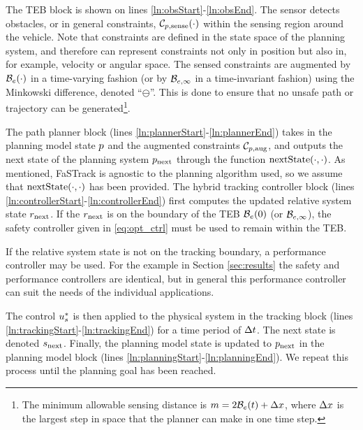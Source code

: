 The TEB block is shown on lines \ref{ln:obsStart}-\ref{ln:obsEnd}. 
The sensor detects obstacles, or in general constraints, $\mathcal C_{p,\text{sense}}(\cdot)$ within the sensing region around the vehicle.
Note that constraints are defined in the state space of the planning system, and therefore can represent constraints not only in position but also in, for example, velocity or angular space.
The sensed constraints are augmented by $\mathcal B_e(\cdot)$ in a time-varying fashion (or by $\mathcal B_{e, \infty}$ in a time-invariant fashion) using the Minkowski difference, denoted ``$\ominus$''. 
This is done to ensure that no unsafe path or trajectory can be generated\footnote{The minimum allowable sensing distance is $m = 2\mathcal B_e(t) + \Delta x$, where $\Delta x$ is the largest step in space that the planner can make in one time step.}.

The path planner block (lines \ref{ln:plannerStart}-\ref{ln:plannerEnd}) takes in the planning model state $p$ and the augmented constraints $\mathcal C_{p,\text{aug}}$, and outputs the next state of the planning system $p_\text{next}$ through the function $\text{nextState}(\cdot, \cdot)$.
As mentioned, FaSTrack is agnostic to the planning algorithm used, so we assume that $\text{nextState}(\cdot, \cdot)$ has been provided.
The hybrid tracking controller block (lines \ref{ln:controllerStart}-\ref{ln:controllerEnd}) first computes the updated relative system state $r_\text{next}$. 
If the $r_\text{next}$ is on the boundary of the TEB $\mathcal B_e(0)$ (or $\mathcal B_{e, \infty}$), the safety controller given in \eqref{eq:opt_ctrl} must be used to remain within the TEB. 

If the relative system state is not on the tracking boundary, a performance controller may be used. For the example in Section \ref{sec:results} the safety and performance controllers are identical, but in general this performance controller can suit the needs of the individual applications.

The control $u_s^*$ is then applied to the physical system in the tracking block (lines \ref{ln:trackingStart}-\ref{ln:trackingEnd}) for a time period of $\Delta t$. 
The next state is denoted $s_\text{next}$. 
Finally, the planning model state is updated to $p_\text{next}$ in the planning model block (lines \ref{ln:planningStart}-\ref{ln:planningEnd}). 
We repeat this process until the planning goal has been reached.